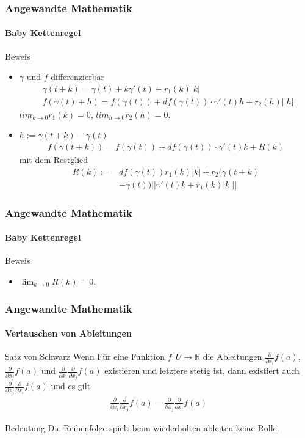 \documentclass{beamer}
\begin{document}
\begin{frame}
    \frametitle{Angewandte Mathematik}
\framesubtitle{Baby Kettenregel}
    \begin{block}{Beweis}
\begin{itemize}
\item $\gamma$ und $f$ differenzierbar
\begin{align*}
& \gamma (t + k) = \gamma(t) + k \gamma'(t) + r_1 (k) |k|\\
& f(\gamma(t) + h) = f(\gamma(t)) + df(\gamma(t)) \cdot \gamma'(t) h +  r_2 (h)  ||h|| 
\end{align*}
 $lim_{k \to 0} r_1(k) = 0$, $lim_{h \to 0} r_2(h) = 0$.
\pause \item  $h:= \gamma(t + k) - \gamma(t)$ 
\begin{align*}
f(\gamma(t + k)) = f(\gamma(t)) + df(\gamma(t)) \cdot \gamma'(t) k +  R(k)
\end{align*}  
mit dem Restglied
\begin{align*}
R(k) := & df(\gamma(t)) r_1(k) |k| + r_2 \bigl( \gamma (t + k) \\
 & - \gamma(t) \bigr) ||\gamma'(t) k + r_1(k) |k| || 
\end{align*}  
\end{itemize}
\end{block}
 \end{frame}

\begin{frame}
    \frametitle{Angewandte Mathematik}
\framesubtitle{Baby Kettenregel}
    \begin{block}{Beweis}
\begin{itemize}
\item $\lim_{k \to 0} R(k) = 0$.
\end{itemize}
\end{block}
 \end{frame}



\begin{frame}
    \frametitle{Angewandte Mathematik}
\framesubtitle{Vertauschen von Ableitungen}
    \begin{block}{Satz von Schwarz}
Wenn Für eine Funktion $f: U \to \mathbb{R}$ die Ableitungen $\frac{\partial}{\partial x_i} f(a)$, $\frac{\partial}{\partial x_j}f(a)$ und $ \frac{\partial}{\partial x_i}\frac{\partial }{\partial x_j} f(a)$ existieren und letztere stetig ist, dann existiert auch $ \frac{\partial}{\partial x_j}\frac{\partial }{\partial x_i} f(a)$ und es gilt
\begin{align*}
\frac{\partial}{\partial x_i}\frac{\partial }{\partial x_j} f(a) = \frac{\partial}{\partial x_j}\frac{\partial }{\partial x_i} f(a)
\end{align*}
\end{block}
    \begin{block}{Bedeutung}
Die Reihenfolge spielt beim wiederholten ableiten keine Rolle.
\end{block}
 \end{frame}
\end{document}

